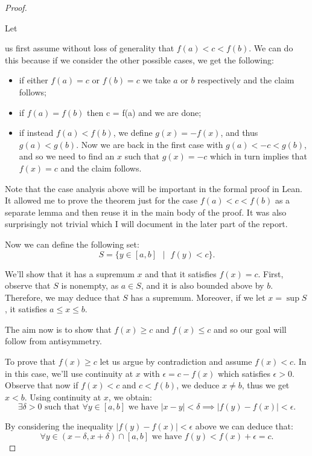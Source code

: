 \documentclass[11pt]{article}
\newcommand\sucht{\text{ such that }}
\newcommand\weh{\text{ we have }}
\begin{document}
\begin{proof}
  \hypertarget{general_cases}{Let} us first assume without loss of generality that $f(a) < c < f(b)$. We can
  do this because if we consider the other possible cases, we get the following:
  \begin{itemize}
    \item if either $f(a) = c$ or $f(b) = c$ we take $a$ or $b$ respectively
      and the claim follows;
    \item if $f(a) = f(b)$ then c = f(a) and we are done;
    \item if instead $f(a) < f(b)$, we define $g(x) = -f(x)$, and thus
      $g(a) < g(b)$. Now we are back in the first case with $g(a) < -c < g(b)$,
      and so we need to find an $x$ such that $g(x) = - c$ which in turn implies
      that $f(x) = c$ and the claim follows.
  \end{itemize}

Note that the case analysis above will be important in the formal proof in
Lean. It allowed me to prove the theorem just for the case $f(a) < c < f(b)$ as
a separate lemma and then reuse it in the main body of the proof. It was also
surprisingly not trivial which I will document in the later part of the report.

Now we can define the following set:
\[
  S = \lbrace y \in [a, b] \text{ } | \text{ } f(y) < c\rbrace
.\]

We'll show that it has a supremum $x$ and that it satisfies $f(x) = c$. First,
observe that $S$ is nonempty, as $ a \in S $, and it is also bounded above by
$b$. Therefore, we may deduce that $S$ has a supremum. Moreover, if we let
$x = \sup S$, it satisfies $a \le x \le b$.

The aim now is to show that $f(x) \ge c$ and  $f(x) \le c$ and so our goal
will follow from antisymmetry.

To prove that $f(x) \ge c$ let us argue by contradiction and assume $f(x) < c$.
In in this case, we'll use continuity at  $x$ with  $\epsilon = c - f(x) $
which satisfies  $\epsilon > 0$. Observe that now if $f(x) < c$ and $c <
f(b)$, we deduce  $x \ne b$, thus we get  $x < b$. Using continuity at $x$, we obtain:
\[
\exists \delta > 0 \sucht \forall y \in [a, b] \weh | x - y | < \delta \implies |f(y) - f(x)| < \epsilon .\]

By considering the inequality $|f(y) - f(x)| < \epsilon $ above
we can deduce that:
\[
  \forall y \in (x - \delta, x + \delta) \cap [a, b] \weh f(y) < f(x) + \epsilon = c
.\]


\end{proof}
\end{document}
